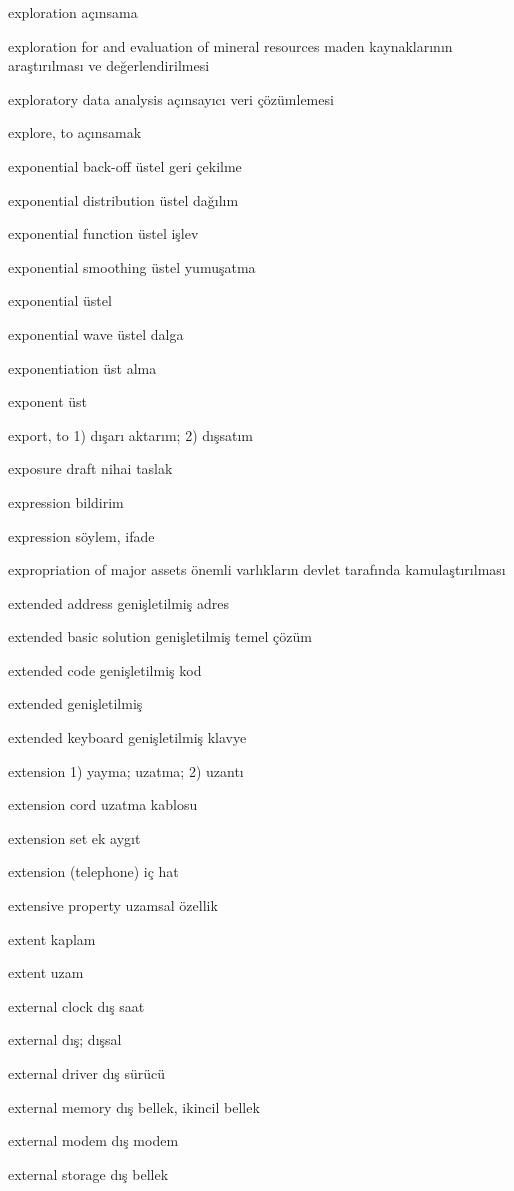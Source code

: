 \documentclass[12pt,fleqn]{article}\usepackage{../../common}
\begin{document}
exploration açınsama

exploration for and evaluation of mineral resources maden kaynaklarının araştırılması ve değerlendirilmesi

exploratory data analysis açınsayıcı veri çözümlemesi

explore, to açınsamak

exponential back-off üstel geri çekilme

exponential distribution üstel dağılım

exponential function üstel işlev

exponential smoothing üstel yumuşatma

exponential üstel

exponential wave üstel dalga

exponentiation üst alma

exponent üst

export, to 1) dışarı aktarım; 2) dışsatım

exposure draft nihai taslak

expression bildirim

expression söylem, ifade

expropriation of major assets önemli varlıkların devlet tarafında kamulaştırılması

extended address genişletilmiş adres

extended basic solution genişletilmiş temel çözüm

extended code genişletilmiş kod

extended genişletilmiş

extended keyboard genişletilmiş klavye

extension 1) yayma; uzatma; 2) uzantı

extension cord uzatma kablosu

extension set ek aygıt

extension (telephone) iç hat

extensive property uzamsal özellik

extent kaplam

extent uzam

external clock dış saat

external dış; dışsal

external driver dış sürücü

external memory dış bellek, ikincil bellek

external modem dış modem

external storage dış bellek
\end{document}
